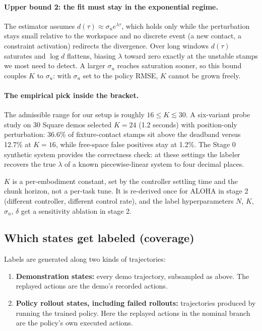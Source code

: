 \documentclass[11pt]{article}
\begin{document}
\paragraph{Upper bound 2: the fit must stay in the exponential regime.}
The estimator assumes $d(\tau) \approx \sigma_u e^{\lambda \tau}$, which holds only
while the perturbation stays small relative to the workspace and no discrete event
(a new contact, a constraint activation) redirects the divergence. Over long windows
$d(\tau)$ saturates and $\log d$ flattens, biasing $\lambda$ toward zero exactly at
the unstable stamps we most need to detect. A larger $\sigma_u$ reaches saturation
sooner, so this bound couples $K$ to $\sigma_u$: with $\sigma_u$ set to the policy
RMSE, $K$ cannot be grown freely.

\paragraph{The empirical pick inside the bracket.}
The admissible range for our setup is roughly $16 \leq K \lesssim 30$. A six-variant
probe study on 30 Square demos selected $K = 24$ (1.2 seconds) with position-only
perturbation: 36.6\% of fixture-contact stamps sit above the deadband versus 12.7\%
at $K = 16$, while free-space false positives stay at 1.2\%. The Stage 0 synthetic
system provides the correctness check: at these settings the labeler recovers the
true $\lambda$ of a known piecewise-linear system to four decimal places.

$K$ is a per-embodiment constant, set by the controller settling time and the chunk
horizon, not a per-task tune. It is re-derived once for ALOHA in stage 2 (different
controller, different control rate), and the label hyperparameters $N$, $K$,
$\sigma_u$, $\delta$ get a sensitivity ablation in stage 2.

\subsection{Which states get labeled (coverage)}

Labels are generated along two kinds of trajectories:

\begin{enumerate}[leftmargin=2em]
  \item \textbf{Demonstration states:} every demo trajectory, subsampled as above. The
        replayed actions are the demo's recorded actions.
  \item \textbf{Policy rollout states, including failed rollouts:} trajectories produced
        by running the trained policy. Here the replayed actions in the nominal branch
        are the policy's own executed actions.
\end{enumerate}
\end{document}
